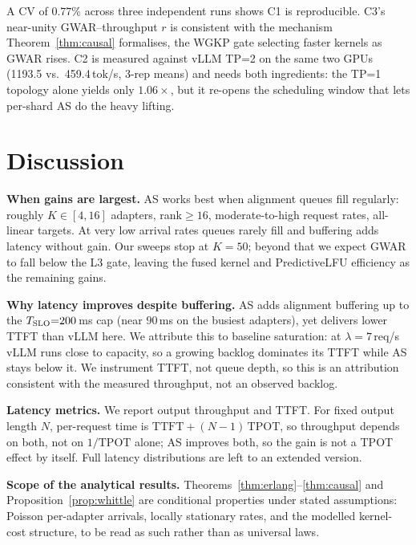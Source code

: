 \documentclass[conference]{IEEEtran}
\newcommand{\asys}{AS\xspace}
\begin{document}
A CV of $0.77\%$ across three independent runs shows C1 is reproducible.
C3's near-unity GWAR--throughput $r$ is consistent with the mechanism
Theorem~\ref{thm:causal} formalises, the WGKP gate selecting faster kernels as
GWAR rises.
C2 is measured against vLLM TP=2 on the same two GPUs (1193.5 vs.\
459.4\,tok/s, 3-rep means) and needs both ingredients: the TP=1 topology alone
yields only $1.06{\times}$, but it re-opens the scheduling window that lets
per-shard \asys do the heavy lifting.

\section{Discussion}
\label{sec:discussion}

\textbf{When gains are largest.}
\asys works best when alignment queues fill regularly: roughly $K{\in}[4,16]$
adapters, rank${\geq}16$, moderate-to-high request rates, all-linear targets.
At very low arrival rates queues rarely fill and buffering adds latency without
gain.  Our sweeps stop at $K{=}50$; beyond that we expect GWAR to fall below the
L3 gate, leaving the fused kernel and PredictiveLFU efficiency as the remaining
gains.

\textbf{Why latency improves despite buffering.}
\asys adds alignment buffering up to the $T_{\rm SLO}{=}200$\,ms cap (near
$90$\,ms on the busiest adapters), yet delivers lower TTFT than vLLM here.
We attribute this to baseline saturation: at $\lambda{=}7$\,req/s vLLM runs close
to capacity, so a growing backlog dominates its TTFT while \asys stays below it.
We instrument TTFT, not queue depth, so this is an attribution consistent with
the measured throughput, not an observed backlog.

\textbf{Latency metrics.}
We report output throughput and TTFT.  For fixed output length $N$, per-request
time is $\mathrm{TTFT}+(N{-}1)\,\mathrm{TPOT}$, so throughput depends on both, not
on $1/\mathrm{TPOT}$ alone; \asys improves both, so the gain is not a TPOT effect
by itself.  Full latency distributions are left to an extended version.

\textbf{Scope of the analytical results.}
Theorems~\ref{thm:erlang}--\ref{thm:causal} and Proposition~\ref{prop:whittle}
are conditional properties under stated assumptions: Poisson per-adapter
arrivals, locally stationary rates, and the modelled kernel-cost structure, to be
read as such rather than as universal laws.
\end{document}
